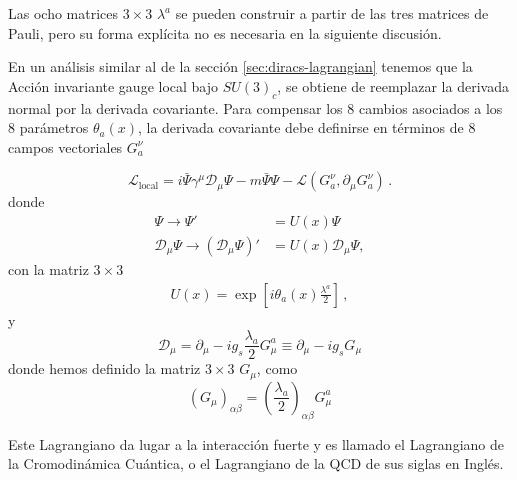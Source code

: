 Las ocho matrices $3\times3$ $\lambda^a$ se pueden construir a partir de las tres matrices de Pauli, pero su forma explícita no es necesaria en la siguiente discusión.

En un análisis similar al de la sección \ref{sec:diracs-lagrangian} tenemos que la Acción invariante gauge local bajo $SU(3)_c$, se obtiene de reemplazar la derivada normal por la derivada covariante. Para compensar los 8 cambios asociados a los 8 parámetros $\theta_a(x)$, la derivada covariante debe definirse en términos de 8 campos vectoriales $G^\nu_a$
\begin{frame}%
\begin{equation}
  \label{eq:127qft}
  \mathcal{L}_{\text{local}}=i\bar{\Psi}\gamma^\mu\mathcal{D}_\mu\Psi-m\bar{\Psi}\Psi
  -\mathcal{L}\left( G^{\nu}_{a},\partial_{\mu}G^{\nu}_{a} \right)\,.%
\end{equation}
donde
\begin{align}
  \label{eq:qcdtr}
  \Psi\to \Psi'&=U(x)\Psi\nonumber\\
  \mathcal{D}_\mu\Psi\to \left(\mathcal{D}_\mu\Psi\right)'&
  =U(x)\mathcal{D}_\mu\Psi,
\end{align}
con la matriz $3\times 3$
\begin{align}
  U(x)=\exp\left[i\theta_a(x)\frac{\lambda^a}{2}\right]\,,
\end{align}
y
\begin{equation}
  \mathcal{D}_\mu=\partial_\mu-i g_s\frac{\lambda_a}{2}G_\mu^a\equiv\partial_\mu-i g_s {G}_\mu
\end{equation}
donde hemos definido la matriz $3\times 3$  $G_\mu$, como
\begin{equation}
  \left({G}_\mu\right)_{\alpha\beta}=\left(\frac{\lambda_a}{2}\right)_{\alpha\beta}G_\mu^a
\end{equation}
\end{frame}
Este Lagrangiano da lugar a la interacción fuerte y es llamado el Lagrangiano de la Cromodinámica Cuántica, o el Lagrangiano de la QCD de sus siglas en Inglés.

